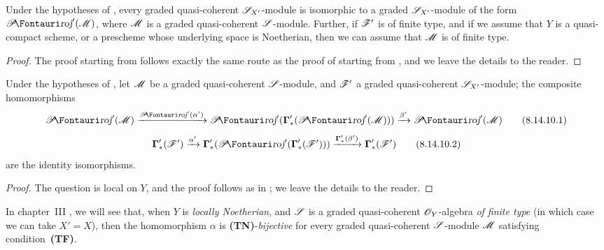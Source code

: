 \begin{corollary}[8.14.9]
\label{II.8.14.9}
Under the hypotheses of , every graded quasi-coherent $\mathscr{S}_{X'}$-module is isomorphic to a graded $\mathscr{S}_{X'}$-module of the form $\shProj'(\sh{M})$, where $\mathscr{M}$ is a graded quasi-coherent $\mathscr{S}$-module.
Further, if $\mathscr{F}'$ is of finite type, and if we assume that $Y$ is a quasi-compact scheme, or a prescheme whose underlying space is Noetherian, then we can assume that $\mathscr{M}$ is of finite type.
\end{corollary}

\begin{proof}
\label{proof-II.8.14.9}
The proof starting from  follows exactly the same route as the proof of  starting from , and we leave the details to the reader.
\end{proof}

\begin{proposition}[8.14.10]
\label{II.8.14.10}
Under the hypotheses of , let $\mathscr{M}$ be a graded quasi-coherent $\mathscr{S}$-module, and $\mathscr{F}'$ a graded quasi-coherent $\mathscr{S}_{X'}$-module;
the composite homomorphisms
\[
\label{II.8.14.10.1}
    \shProj'(\sh{M})
    \xrightarrow{\shProj'(\alpha')}
    \shProj'(\boldsymbol{\Gamma}'_*(\shProj'(\sh{M})))
    \xrightarrow{\beta'}
    \shProj'(\sh{M})
\tag{8.14.10.1}
\]
\[
\label{II.8.14.10.2}
    \boldsymbol{\Gamma}'_*(\sh{F}')
    \xrightarrow{\alpha'}
    \boldsymbol{\Gamma}'_*(\shProj'(\boldsymbol{\Gamma}'_*(\sh{F}')))
    \xrightarrow{\boldsymbol{\Gamma}'_*(\beta')}
    \boldsymbol{\Gamma}'_*(\sh{F}')
\tag{8.14.10.2}
\]
are the identity isomorphisms.
\end{proposition}

\begin{proof}
\label{proof-II.8.14.10}
The question is local on $Y$, and the proof follows as in ;
we leave the details to the reader.
\end{proof}

\begin{remark}[8.14.11]
\label{II.8.14.11}
In chapter~III , we will see that, when $Y$ is \emph{locally Noetherian}, and $\mathscr{S}$ is a graded quasi-coherent $\mathscr{O}_Y$-algebra \emph{of finite type} (in which case
we can take $X'=X$), then the homomorphism $\alpha$  is \textbf{(TN)}-\emph{bijective} for every graded quasi-coherent $\mathscr{S}$-module $\mathscr{M}$ satisfying condition~\textbf{(TF)}.
\end{remark}

